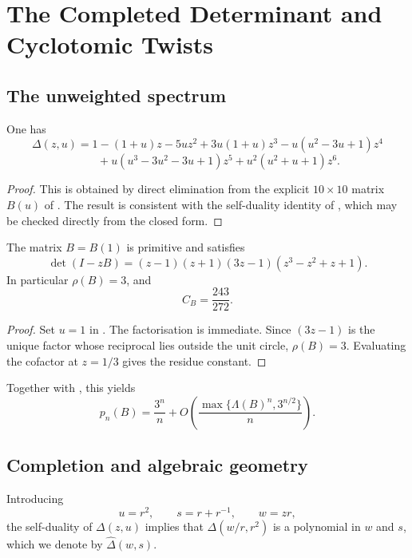 \section{The Completed Determinant and Cyclotomic Twists}
\label{sec:kernel}

\subsection{The unweighted spectrum}

\begin{proposition}\label{prop:kernel-delta-explicit}
One has
\[
  \Delta(z,u)
  =1-(1+u)z-5uz^2+3u(1+u)z^3-u(u^2-3u+1)z^4
\]
\[
  \qquad
  +u(u^3-3u^2-3u+1)z^5+u^2(u^2+u+1)z^6.
\]
\end{proposition}

\begin{proof}
This is obtained by direct elimination from the explicit
\(10\times 10\) matrix \(B(u)\) of . The result
is consistent with the self-duality identity of
, which may be checked directly from the
closed form.
\end{proof}

\begin{proposition}
  \label{prop:sync-kernel-spectrum}
  The matrix \(B=B(1)\) is primitive and satisfies
  \[
    \det(I-zB)=(z-1)(z+1)(3z-1)(z^3-z^2+z+1).
  \]
  In particular \(\rho(B)=3\), and
  \[
    C_B=\frac{243}{272}.
  \]
\end{proposition}

\begin{proof}
Set \(u=1\) in . The factorisation is
immediate. Since \((3z-1)\) is the unique factor whose reciprocal lies
outside the unit circle, \(\rho(B)=3\). Evaluating the cofactor at
\(z=1/3\) gives the residue constant.
\end{proof}

Together with , this yields
\[
  p_n(B)=\frac{3^n}{n}
  +O\!\left(\frac{\max\{\Lambda(B)^n,3^{n/2}\}}{n}\right).
\]

\subsection{Completion and algebraic geometry}

Introducing
\[
  u=r^2,\qquad s=r+r^{-1},\qquad w=zr,
\]
the self-duality of \(\Delta(z,u)\) implies that
\(\Delta(w/r,r^2)\) is a polynomial in \(w\) and \(s\), which we denote
by \(\widehat\Delta(w,s)\).

